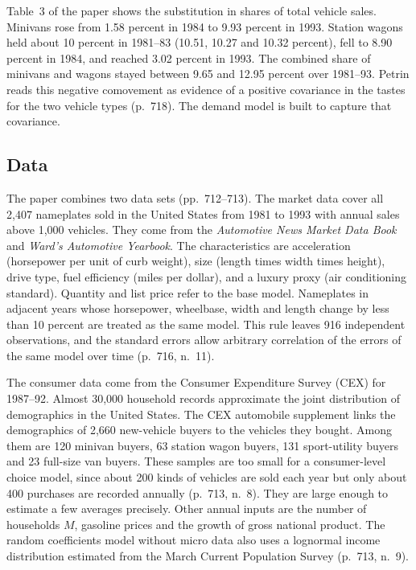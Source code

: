 Table~3 of the paper shows the substitution in shares of total vehicle sales. Minivans rose from 1.58 percent in 1984 to
9.93 percent in 1993. Station wagons held about 10 percent in 1981--83 (10.51, 10.27 and 10.32 percent), fell to 8.90
percent in 1984, and reached 3.02 percent in 1993. The combined share of minivans and wagons stayed between 9.65 and
12.95 percent over 1981--93. Petrin reads this negative comovement as evidence of a positive covariance in the tastes
for the two vehicle types (p.~718). The demand model is built to capture that covariance.

\subsection{Data}\label{sec:10-petrin-data}

The paper combines two data sets (pp.~712--713). The market data cover all 2,407 nameplates sold in the United States
from 1981 to 1993 with annual sales above 1,000 vehicles. They come from the \textit{Automotive News Market Data
Book} and \textit{Ward's Automotive Yearbook}. The characteristics are acceleration (horsepower per unit of curb
weight), size (length times width times height), drive type, fuel efficiency (miles per dollar), and a luxury proxy
(air conditioning standard). Quantity and list price refer to the base model. Nameplates in adjacent years whose
horsepower, wheelbase, width and length change by less than 10 percent are treated as the same model. This rule leaves
916 independent observations, and the standard errors allow arbitrary correlation of the errors of the same model over
time (p.~716, n.~11).

The consumer data come from the Consumer Expenditure Survey (CEX) for 1987--92. Almost 30,000 household records
approximate the joint distribution of demographics in the United States. The CEX automobile supplement links the
demographics of 2,660 new-vehicle buyers to the vehicles they bought. Among them are 120 minivan buyers, 63 station
wagon buyers, 131 sport-utility buyers and 23 full-size van buyers. These samples are too small for a consumer-level
choice model, since about 200 kinds of vehicles are sold each year but only about 400 purchases are recorded annually
(p.~713, n.~8). They are large enough to estimate a few averages precisely. Other annual inputs are the number of
households $M$, gasoline prices and the growth of gross national product. The random coefficients model without micro
data also uses a lognormal income distribution estimated from the March Current Population Survey (p.~713, n.~9).

